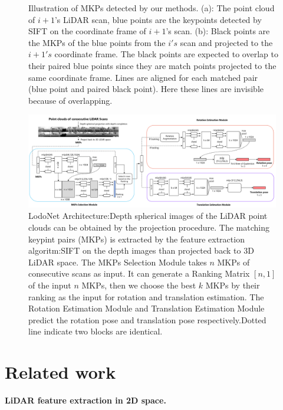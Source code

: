 \documentclass[sigconf]{acmart}
\def\lodo{LodoNet}
\newcommand{\bfsection}[1]{\vspace*{0.1cm}\noindent\textbf{#1.}}
\begin{document}
\begin{figure}[t!]
        \caption{\footnotesize {Illustration of MKPs detected by our methods. (a): The point cloud of $i+1$'s LiDAR scan, blue points are the keypoints detected by SIFT on the coordinate frame of  $i+1$'s scan. (b): Black points are the MKPs of the blue points from the $i's$ scan and projected to the $i+1's$ coordinate frame. The black points are expected to overlap to their paired blue points since they are match points projected to the same coordinate frame. Lines are aligned for each matched pair (blue point and paired black point). Here these lines are invisible because of overlapping. }}
        \label{fig:matching3D}
\end{figure}


\begin{figure}[h]
  \centering
  \includegraphics[width=0.99\textwidth]{Figures/network.png}
  \vspace{-1em}
  \caption{\footnotesize{\lodo{} Architecture:Depth spherical images of the LiDAR point clouds can be obtained by the projection procedure. The matching keypint pairs (MKPs) is extracted by the feature extraction algoritm:SIFT on the depth images than projected back to 3D LiDAR space. The MKPs Selection Module takes $n$ MKPs of consecutive scans as input. It can generate a Ranking Matrix $[n, 1]$ of the input $n$ MKPs, then we choose the best $k$ MKPs by their ranking as the input for rotation and translation estimation. The Rotation Estimation Module and Translation Estimation Module predict the rotation pose and translation pose respectively.Dotted line indicate two blocks are identical.}}
  \label{fig:network}
\end{figure}

\section{Related work}
\bfsection{LiDAR feature extraction in 2D space}
\end{document}
